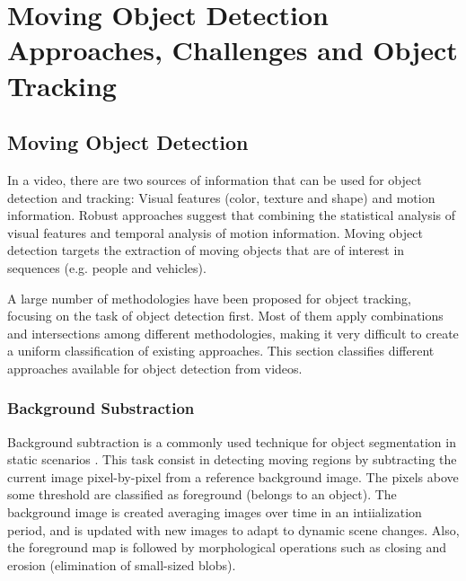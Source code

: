 
\chapter{Moving Object Detection Approaches, Challenges and Object Tracking} %

\label{chapter2} %

\section{Moving Object Detection}


In a video, there are two sources of information that can be used for object detection and tracking: Visual features (color, texture and shape) and motion information. Robust approaches suggest that combining the statistical analysis of visual features and temporal analysis of motion information. Moving object detection targets the extraction of moving objects that are of interest in sequences (e.g. people and vehicles).

A large number of methodologies have been proposed for object tracking, focusing on the task of object detection first. Most of them  apply combinations and intersections among different methodologies, making it very difficult to create a uniform classification of existing approaches. This section classifies different approaches available for object detection from videos.

\subsection{Background Substraction}

Background subtraction is a commonly used technique for object segmentation in static scenarios \cite{McIvor2000}. This task consist in detecting moving regions by subtracting the current image pixel-by-pixel from a reference background image. The pixels above some threshold are classified as foreground (belongs to an object). The background image is created averaging images over time in an intiialization period, and is updated with new images to adapt to dynamic scene changes. Also, the foreground map is followed by morphological operations such as closing and erosion (elimination of small-sized blobs).

